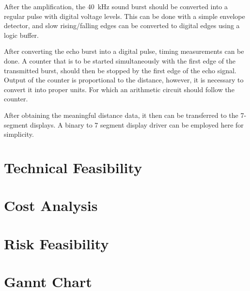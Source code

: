 \documentclass[12pt, a4paper]{article}
\begin{document}
        \bigskip
        After the amplification, the \SI{40}{\kilo\hertz} sound burst should be converted into a regular pulse with digital voltage levels. This can be done with a simple envelope detector, and slow rising/falling edges can be converted to digital edges using a logic buffer. 

        \bigskip
        After converting the echo burst into a digital pulse, timing measurements can be done. A counter that is to be started simultaneously with the first edge of the transmitted burst, should then be stopped by the first edge of the echo signal. Output of the counter is proportional to the distance, however, it is necessary to convert it into proper units. For which an arithmetic circuit should follow the counter.

        \bigskip
        After obtaining the meaningful distance data, it then can be transferred to the 7-segment displays. A binary to 7 segment display driver can be employed here for simplicity.


    \section{Technical Feasibility}
    
    \section{Cost Analysis}

    \section{Risk Feasibility}

    \section{Gannt Chart}



            
\end{document}
